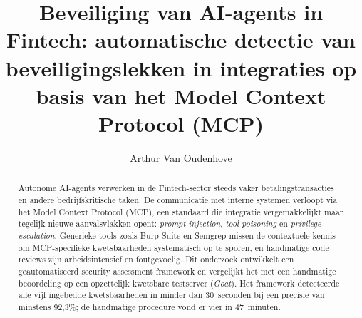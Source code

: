 \documentclass[a0,portrait]{hogent-poster}
\title{Beveiliging van AI-agents in Fintech: automatische detectie van beveiligingslekken in integraties op basis van het Model Context Protocol (MCP)}
\author{Arthur Van Oudenhove}
\begin{document}
\maketitle

\begin{abstract}
Autonome AI-agents verwerken in de Fintech-sector steeds vaker betalingstransacties en andere bedrijfskritische taken. De communicatie met interne systemen verloopt via het Model Context Protocol (MCP), een standaard die integratie vergemakkelijkt maar tegelijk nieuwe aanvalsvlakken opent: \emph{prompt injection}, \emph{tool poisoning} en \emph{privilege escalation}. Generieke tools zoals Burp Suite en Semgrep missen de contextuele kennis om MCP-specifieke kwetsbaarheden systematisch op te sporen, en handmatige code reviews zijn arbeidsintensief en foutgevoelig. Dit onderzoek ontwikkelt een geautomatiseerd security assessment framework en vergelijkt het met een handmatige beoordeling op een opzettelijk kwetsbare testserver (\emph{Goat}). Het framework detecteerde alle vijf ingebedde kwetsbaarheden in minder dan 30~seconden bij een precisie van minstens 92,3\%; de handmatige procedure vond er vier in 47~minuten.
\end{abstract}
\end{document}

